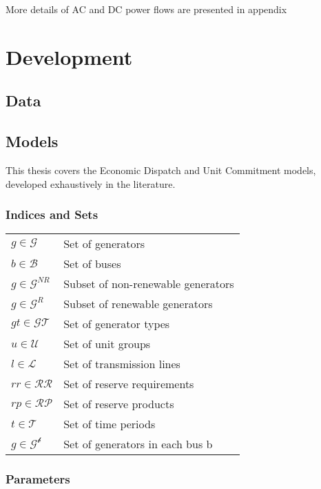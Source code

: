 \documentclass[12pt,LUDisStyle,twosided]{book}
\newcommand{\mc}{\mathcal}
\begin{document}
More details of AC and DC power flows are presented in appendix


\chapter{Development}
\section{Data}

\section{Models}

This thesis covers the Economic Dispatch and Unit Commitment models, developed exhaustively in the literature.

\subsection{Indices and Sets}

\begin{tabular}{ll}

$g \in \mc{G} $& Set of generators\\
$b \in \mc{B} $& Set of buses\\
$g \in \mc{G}^{NR} $& Subset of non-renewable generators\\
$g \in \mc{G}^{R} $& Subset of renewable generators \\
$gt \in \mc{GT} $& Set of generator types \\
$u \in \mc{U} $& Set of unit groups \\
$l \in \mc{L} $& Set of transmission lines \\
$rr \in \mc{RR} $& Set of reserve requirements \\
$rp \in \mc{RP} $& Set of reserve products \\
$t \in \mc{T} $& Set of time periods \\
$g \in \mc{G^{b}} $& Set of generators in each bus b \\

\end{tabular}

\subsection{Parameters}
\end{document}
